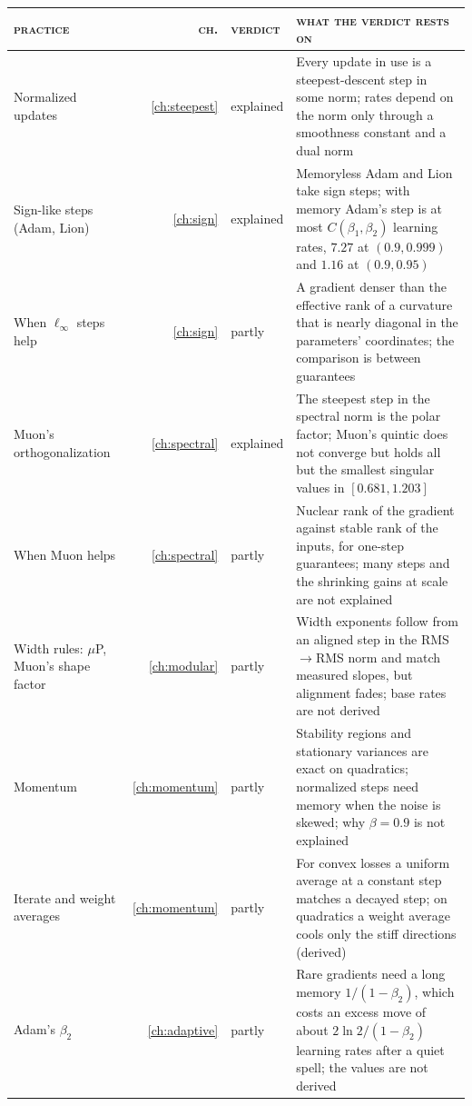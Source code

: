 \begin{refsection}
\begin{table}[p]
\begin{fullwidth}
\centering\footnotesize
\renewcommand{\arraystretch}{1.14}
\begin{tabular}{@{}>{\raggedright\arraybackslash}p{31mm}r>{\raggedright\arraybackslash}p{17mm}>{\raggedright\arraybackslash}p{104mm}@{}}
\toprule
\textsc{practice} & \textsc{ch.} & \textsc{verdict} & \textsc{what the verdict rests on}\\
\midrule
Normalized updates & \ref{ch:steepest} & explained & Every update in use is a steepest-descent step in some norm; rates depend on the norm only through a smoothness constant and a dual norm\\
Sign-like steps (Adam, Lion) & \ref{ch:sign} & explained & Memoryless Adam and Lion take sign steps; with memory Adam's step is at most $C(\beta_1,\beta_2)$ learning rates, $7.27$ at $(0.9,0.999)$ and $1.16$ at $(0.9,0.95)$\\
When $\ell_\infty$ steps help & \ref{ch:sign} & partly & A gradient denser than the effective rank of a curvature that is nearly diagonal in the parameters' coordinates; the comparison is between guarantees\\
Muon's orthogonalization & \ref{ch:spectral} & explained & The steepest step in the spectral norm is the polar factor; Muon's quintic does not converge but holds all but the smallest singular values in $[0.681,1.203]$\\
When Muon helps & \ref{ch:spectral} & partly & Nuclear rank of the gradient against stable rank of the inputs, for one-step guarantees; many steps and the shrinking gains at scale are not explained\\
Width rules: $\mu$P, Muon's shape factor & \ref{ch:modular} & partly & Width exponents follow from an aligned step in the RMS$\to$RMS norm and match measured slopes, but alignment fades; base rates are not derived\\
Momentum & \ref{ch:momentum} & partly & Stability regions and stationary variances are exact on quadratics; normalized steps need memory when the noise is skewed; why $\beta=0.9$ is not explained\\
Iterate and weight averages & \ref{ch:momentum} & partly & For convex losses a uniform average at a constant step matches a decayed step; on quadratics a weight average cools only the stiff directions (derived)\\
Adam's $\beta_2$ & \ref{ch:adaptive} & partly & Rare gradients need a long memory $1/(1-\beta_2)$, which costs an excess move of about $2\ln2/(1-\beta_2)$ learning rates after a quiet spell; the values are not derived\\

\end{tabular}
\end{fullwidth}
\end{table}
\end{refsection}
